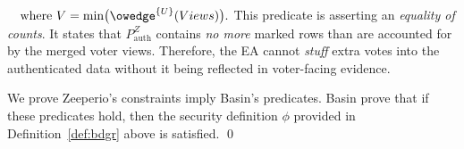 $\quad\text{where }V=\min\bigl(\owedge^{\{U\}}(Views)\bigr).$ This predicate is asserting an \emph{equality of counts}.
It states that $P_{\mathrm{auth}}^{Z}$ contains \emph{no more} marked rows than are accounted for by the merged voter views.
Therefore, the EA cannot \emph{stuff} extra votes into the authenticated data without it being reflected in voter-facing evidence.



We prove Zeeperio's constraints imply Basin's predicates. Basin \etal prove that if these predicates hold, then the security definition $\phi$ provided in Definition~\ref{def:bdgr} above is satisfied. \qed
